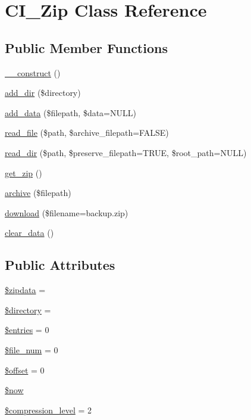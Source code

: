 \hypertarget{class_c_i___zip}{}\section{C\+I\+\_\+\+Zip Class Reference}
\label{class_c_i___zip}
\subsection*{Public Member Functions}
\begin{DoxyCompactItemize}
\item 
\mbox{\hyperlink{class_c_i___zip_a095c5d389db211932136b53f25f39685}{\+\_\+\+\_\+construct}} ()
\item 
\mbox{\hyperlink{class_c_i___zip_a86b6a309dad105e43b446dc9f8820703}{add\+\_\+dir}} (\$directory)
\item 
\mbox{\hyperlink{class_c_i___zip_a8d541e6609a5b2634a6a2bc7731465a5}{add\+\_\+data}} (\$filepath, \$data=N\+U\+LL)
\item 
\mbox{\hyperlink{class_c_i___zip_aa43eef46a052a3aff7a2ff0bf5c21c75}{read\+\_\+file}} (\$path, \$archive\+\_\+filepath=F\+A\+L\+SE)
\item 
\mbox{\hyperlink{class_c_i___zip_a296847a86d7cf0e4bba9b71a173cfffe}{read\+\_\+dir}} (\$path, \$preserve\+\_\+filepath=T\+R\+UE, \$root\+\_\+path=N\+U\+LL)
\item 
\mbox{\hyperlink{class_c_i___zip_a263fd906f99ccca15a12fe34a79656e4}{get\+\_\+zip}} ()
\item 
\mbox{\hyperlink{class_c_i___zip_a935879d7074c751a4ac886aebd66cbd4}{archive}} (\$filepath)
\item 
\mbox{\hyperlink{class_c_i___zip_ad4263f6c296942842ae25a94053c5f16}{download}} (\$filename=\textquotesingle{}backup.\+zip\textquotesingle{})
\item 
\mbox{\hyperlink{class_c_i___zip_a89d046bac0ab06a81c5c03d55b4bcae5}{clear\+\_\+data}} ()
\end{DoxyCompactItemize}
\subsection*{Public Attributes}
\begin{DoxyCompactItemize}
\item 
\mbox{\hyperlink{class_c_i___zip_a395accfd5884d9a0e6fd53470b3e85b1}{\$zipdata}} = \textquotesingle{}\textquotesingle{}
\item 
\mbox{\hyperlink{class_c_i___zip_a1b07c630eb02f770a082a013373a16d6}{\$directory}} = \textquotesingle{}\textquotesingle{}
\item 
\mbox{\hyperlink{class_c_i___zip_affb4200921149b6126d0e51b415b2c75}{\$entries}} = 0
\item 
\mbox{\hyperlink{class_c_i___zip_af1ab53ee1a849492829ce782aac0163d}{\$file\+\_\+num}} = 0
\item 
\mbox{\hyperlink{class_c_i___zip_aec4de82415d7f05cb9748d12d3a95a87}{\$offset}} = 0
\item 
\mbox{\hyperlink{class_c_i___zip_af1d5ccdee975b8f4d20aaffc5b28557c}{\$now}}
\item 
\mbox{\hyperlink{class_c_i___zip_a9a4e30766e452f0d2feaecd666787ca1}{\$compression\+\_\+level}} = 2
\end{DoxyCompactItemize}
